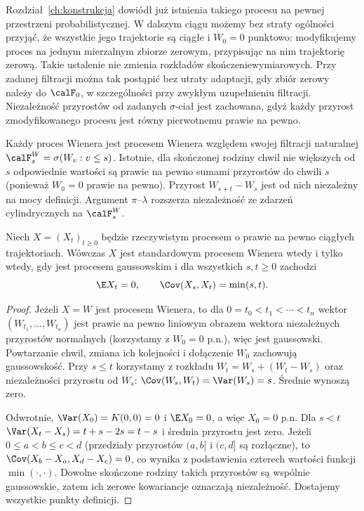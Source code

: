 Rozdział~\ref{ch:konstrukcja} dowiódł już istnienia takiego
procesu na pewnej przestrzeni probabilistycznej.
W dalszym ciągu możemy bez straty ogólności przyjąć,
że wszystkie jego trajektorie są ciągłe i $W_0=0$ punktowo:
modyfikujemy proces na jednym mierzalnym zbiorze zerowym,
przypisując na nim trajektorię zerową. Takie ustalenie
nie zmienia rozkładów skończeniewymiarowych. Przy zadanej
filtracji można tak postąpić bez utraty adaptacji, gdy
zbiór zerowy należy do $\calF_0$, w szczególności przy
zwykłym uzupełnieniu filtracji. Niezależność przyrostów
od zadanych $\sigma$-ciał jest zachowana, gdyż każdy
przyrost zmodyfikowanego procesu jest równy pierwotnemu
prawie na pewno.

Każdy proces Wienera jest procesem Wienera względem
swojej filtracji naturalnej $\calF_s^W=\sigma(W_v:v\le s)$.
Istotnie, dla skończonej rodziny chwil nie większych od $s$
odpowiednie wartości są prawie na pewno sumami przyrostów
do chwili $s$ (ponieważ $W_0=0$ prawie na pewno).
Przyrost $W_{s+t}-W_s$ jest od nich niezależny na mocy
definicji. Argument $\pi$--$\lambda$ rozszerza niezależność
ze zdarzeń cylindrycznych na $\calF_s^W$.

\begin{twierdzenie}
Niech $X=(X_t)_{t\ge0}$ będzie rzeczywistym procesem
o prawie na pewno ciągłych trajektoriach. Wówczas $X$
jest standardowym procesem Wienera wtedy i tylko wtedy,
gdy jest procesem gaussowskim i dla wszystkich $s,t\ge0$
zachodzi
\[
\E X_t=0,\qquad \Cov(X_s,X_t)=\min(s,t).
\]
\end{twierdzenie}
\begin{proof}
Jeżeli $X=W$ jest procesem Wienera, to dla
$0=t_0<t_1<\cdots<t_n$ wektor $(W_{t_1},\ldots,W_{t_n})$
jest prawie na pewno liniowym obrazem wektora niezależnych
przyrostów normalnych (korzystamy z $W_0=0$ p.n.),
więc jest gaussowski. Powtarzanie chwil, zmiana ich kolejności
i dołączenie $W_0$ zachowują gaussowskość. Przy $s\le t$ korzystamy z rozkładu
$W_t=W_s+(W_t-W_s)$ oraz niezależności przyrostu od $W_s$:
$\Cov(W_s,W_t)=\Var(W_s)=s$. Średnie wynoszą zero.

Odwrotnie, $\Var(X_0)=K(0,0)=0$ i $\E X_0=0$,
a więc $X_0=0$ p.n. Dla $s<t$
$\Var(X_t-X_s)=t+s-2s=t-s$ i średnia przyrostu
jest zero. Jeżeli $0\le a<b\le c<d$ (przedziały przyrostów
$(a,b]$ i $(c,d]$ są rozłączne),
to $\Cov(X_b-X_a,X_d-X_c)=0$, co wynika z podstawienia
czterech wartości funkcji $\min(\cdot,\cdot)$.
Dowolne skończone rodziny takich przyrostów są wspólnie
gaussowskie, zatem ich zerowe kowariancje oznaczają niezależność.
Dostajemy wszystkie punkty definicji.
\end{proof}

